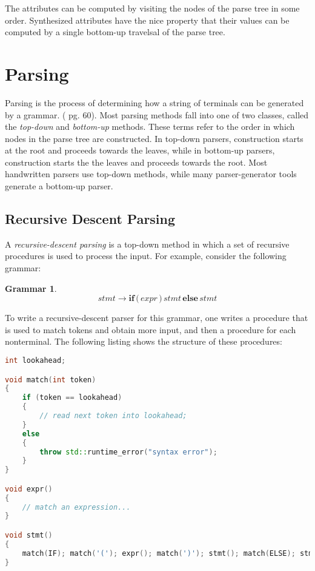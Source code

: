 \documentclass[a4paper,oneside,11pt]{book}
\theoremstyle{definition}
\newtheorem{grmr}{Grammar}[section]
\begin{document}
The attributes can be computed by visiting the nodes of the parse tree in some order.
Synthesized attributes have the nice property that their values can be computed by a single bottom-up travelsal of the parse tree.

\section{Parsing}

Parsing is the process of determining how a string of terminals can be generated by a grammar. (\cite{COMPILERS} pg. 60).
Most parsing methods fall into one of two classes, called the \emph{top-down} and \emph{bottom-up} methods.
These terms refer to the order in which nodes in the parse tree are constructed. In top-down parsers,
construction starts at the root and proceeds towards the leaves, while in  bottom-up parsers, construction starts the the
leaves and proceeds towards the root. Most handwritten parsers use top-down methods, while many parser-generator tools
generate a bottom-up parser.

\subsection{Recursive Descent Parsing}

A \emph{recursive-descent parsing} is a top-down method in which a set of recursive procedures is used to process the input.
For example, consider the following grammar:

\begin{grmr}\label{g:if}
$$
stmt \rightarrow \textbf{if} \, \textbf{(} \, expr \, \textbf{)} \, stmt \, \textbf{else} \, stmt
$$
\end{grmr}

To write a recursive-descent parser for this grammar, one writes a procedure that is used to match tokens and obtain more input,
and then a procedure for each nonterminal.
The following listing shows the structure of these procedures:

\begin{lstlisting}[language=C++]
int lookahead;

void match(int token)
{
    if (token == lookahead)
    {
        // read next token into lookahead;
    }
    else
    {
        throw std::runtime_error("syntax error");
    }
}

void expr()
{
    // match an expression...
}

void stmt()
{
    match(IF); match('('); expr(); match(')'); stmt(); match(ELSE); stmt();
}

\end{lstlisting}
\end{document}
